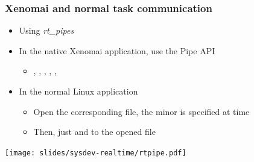 \begin{frame}
  \frametitle{Xenomai and normal task communication}
  \begin{itemize}
  \item Using {\em rt\_pipes}
  \item In the native Xenomai application, use the Pipe API
    \begin{itemize}
    \item {}, ,
      , ,
      , 
    \end{itemize}
  \item In the normal Linux application
    \begin{itemize}
    \item Open the corresponding  file, the minor is specified at
       time
    \item Then, just  and  to the opened file
    \end{itemize}
  \end{itemize}
  \begin{center}
    \texttt{[image: slides/sysdev-realtime/rtpipe.pdf]}
  \end{center}
\end{frame}

